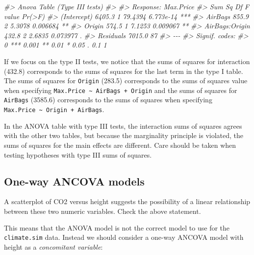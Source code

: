 \documentclass[
]{book}
\newenvironment{Shaded}{\begin{snugshade}}{\end{snugshade}}
\newcommand{\CommentTok}[1]{\textcolor[rgb]{0.56,0.35,0.01}{\textit{#1}}}
\begin{document}
\begin{Shaded}
\begin{Highlighting}[]
\CommentTok{\#\textgreater{} Anova Table (Type III tests)}
\CommentTok{\#\textgreater{} }
\CommentTok{\#\textgreater{} Response: Max.Price}
\CommentTok{\#\textgreater{}                Sum Sq Df F value    Pr(\textgreater{}F)    }
\CommentTok{\#\textgreater{} (Intercept)    6405.3  1 79.4394 6.773e{-}14 ***}
\CommentTok{\#\textgreater{} AirBags         855.9  2  5.3078  0.006684 ** }
\CommentTok{\#\textgreater{} Origin          574.5  1  7.1253  0.009067 ** }
\CommentTok{\#\textgreater{} AirBags:Origin  432.8  2  2.6835  0.073977 .  }
\CommentTok{\#\textgreater{} Residuals      7015.0 87                      }
\CommentTok{\#\textgreater{} {-}{-}{-}}
\CommentTok{\#\textgreater{} Signif. codes:  }
\CommentTok{\#\textgreater{} 0 \textquotesingle{}***\textquotesingle{} 0.001 \textquotesingle{}**\textquotesingle{} 0.01 \textquotesingle{}*\textquotesingle{} 0.05 \textquotesingle{}.\textquotesingle{} 0.1 \textquotesingle{} \textquotesingle{} 1}
\end{Highlighting}
\end{Shaded}

If we focus on the type II tests, we notice that the sums of squares for interaction (432.8) corresponds to the sums of squares for the last term in the type I table. The sums of squares for \texttt{Origin} (283.5) corresponds to the sums of squares value when specifying \texttt{Max.Price\ \textasciitilde{}\ AirBags\ +\ Origin} and the sums of squares for \texttt{AirBags} (3585.6) corresponds to the sums of squares when specifying \texttt{Max.Price\ \textasciitilde{}\ Origin\ +\ AirBags}.

In the ANOVA table with type III tests, the interaction sums of squares agrees with the other two tables, but because the marginality principle is violated, the sums of squares for the main effects are different. Care should be taken when testing hypotheses with type III sums of squares.

\subsection{One-way ANCOVA models}\label{one-way-ancova-models}

A scatterplot of CO2 versus height suggests the possibility of a linear relationship between these two numeric variables. Check the above statement.

This means that the ANOVA model is not the correct model to use for the \texttt{climate.sim} data. Instead we should consider a one-way ANCOVA model with height as a \emph{{concomitant variable}}:
\end{document}
